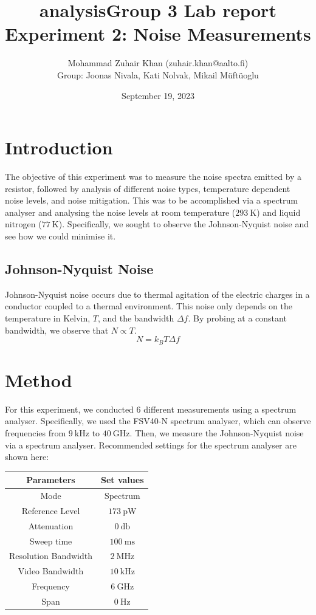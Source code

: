 \documentclass[english,12pt,a4paper]{article}
\title{analysis}
\title{Group 3 Lab report\\Experiment 2: Noise Measurements}
\author{Mohammad Zuhair Khan (zuhair.khan@aalto.fi)\\Group: Joonas Nivala, Kati Nolvak, Mikail Müftüoglu}
\date{September 19, 2023}
\begin{document}
\maketitle
\newpage
\tableofcontents
\newpage
\section{Introduction}
The objective of this experiment was to measure the noise spectra emitted by a resistor, followed by analysis of different noise types, temperature dependent noise levels, and noise mitigation\autocite{morstedtExperimentNoiseMeasurements2023}. This was to be accomplished via a spectrum analyser and analysing the noise levels at room temperature ($\qty{293}{\kelvin}$) and liquid nitrogen ($\qty{77}{\kelvin}$). Specifically, we sought to observe the Johnson-Nyquist noise\autocite{nyquistThermalAgitationElectric1928} and see how we could minimise it.
\subsection{Johnson-Nyquist Noise}
Johnson-Nyquist noise occurs due to thermal agitation of the electric charges in a conductor coupled to a thermal environment\autocite{morstedtExperimentNoiseMeasurements2023,nyquistThermalAgitationElectric1928}. This noise only depends on the temperature in Kelvin, $T$, and the bandwidth $\Delta f$. By probing at a constant bandwidth, we observe that $N \propto T$.
\begin{equation}
	N = k_BT\Delta f
\end{equation}
\section{Method}
For this experiment, we conducted $6$ different measurements using a spectrum analyser. Specifically, we used the FSV40-N spectrum analyser, which can observe frequencies from $\qty{9}{\kilo\hertz}$ to $\qty{40}{\giga\hertz}$. Then, we measure the Johnson-Nyquist noise via a spectrum analyser. Recommended settings for the spectrum analyser are shown here: 

\begin{tabular}{|c|c|}
	\hline
	Parameters & Set values \\
	\hline
	Mode & Spectrum \\
	\hline
	Reference Level  & $\qty{173}{\pico\watt}$ \\
	\hline
	Attenuation &$\qty{0}{\decibel}$ \\
	\hline
	Sweep time & $\qty{100}{\milli\second}$\\
	\hline
	Resolution Bandwidth&  $\qty{2}{\mega\hertz}$ \\
	\hline
	Video Bandwidth &  $\qty{10}{\kilo\hertz}$ \\
	\hline
	Frequency & $\qty{6}{\giga\hertz}$ \\
	\hline
	Span &  $\qty{0}{\hertz}$\\
	\hline
\end{tabular}
\end{document}
